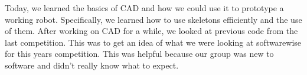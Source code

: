 	
Today, we learned the basics of CAD and how we could use it to prototype a working robot. Specifically, we learned how to use skeletons efficiently and the use of them. After working on CAD for a while, we looked at previous code from the last competition. This was to get an idea of what we were looking at softwarewise for this years competition. This was helpful because our group was new to software and didn't really know what to expect.  




